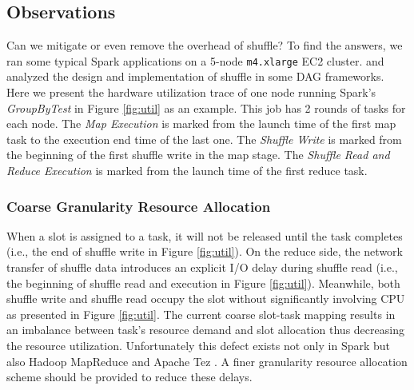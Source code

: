 \subsection{Observations} \label{observation}
Can we mitigate or even remove the overhead of shuffle? 
To find the answers, we ran some typical Spark applications on a 5-node \texttt{m4.xlarge} EC2 cluster.
and analyzed the design and implementation of shuffle in some DAG frameworks.
Here we present the hardware utilization trace of one node running Spark's \textit{GroupByTest} in Figure \ref{fig:util} as an example. 
This job has 2 rounds of tasks for each node.
The \textit{Map Execution} is marked from the launch time of the first map task to the execution end time of the last one. 
The \textit{Shuffle Write} is marked from the beginning of the first shuffle write in the map stage. 
The \textit{Shuffle Read and Reduce Execution} is marked from the launch time of the first reduce task.
\subsubsection{Coarse Granularity Resource Allocation}
When a slot is assigned to a task, it will not be released until the task completes (i.e., the end of shuffle write in Figure \ref{fig:util}). 
On the reduce side, the network transfer of shuffle data introduces an explicit I/O delay during shuffle read (i.e., the beginning of shuffle read and execution in Figure \ref{fig:util}). 
Meanwhile, both shuffle write and shuffle read occupy the slot without significantly involving CPU as presented in Figure \ref{fig:util}. 
The current coarse slot-task mapping results in an imbalance between task's resource demand and slot allocation thus decreasing the resource utilization. 
Unfortunately this defect exists not only in Spark \cite{apachespark} but also Hadoop MapReduce \cite{hadoop} and Apache Tez \cite{tez}. 
A finer granularity resource allocation scheme should be provided to reduce these delays. 

